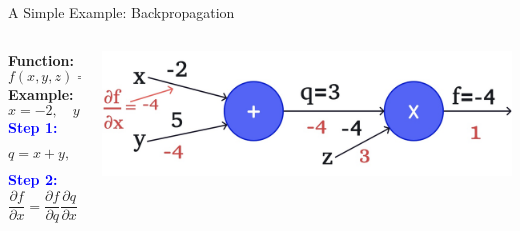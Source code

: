 \documentclass[serif, aspectratio=169]{beamer}
\begin{document}
\begin{frame}{A Simple Example: Backpropagation}

    \begin{columns}
       
        \begin{column}{0.3\textwidth}
            \vspace{-0.4cm}
            \textbf{Function:} 
            \[
            f(x, y, z) = (x + y)z
            \]
            \textbf{Example:} 
            \[
            x = -2, \quad y = 5, \quad z = -4
            \]
            \vspace{-0.4cm}
            \textcolor{blue}{\textbf{Step 1:}}
            \[
             q = x + y, \quad
            \frac{\partial q}{\partial x} = 1, \quad \frac{\partial q}{\partial y} = 1
            \]
            \vspace{-0.2cm}
            \textcolor{blue}{\textbf{Step 2:}}
            \[
            \frac{\partial f}{\partial x} =  \frac{\partial f}{\partial q}
            \frac{\partial q}{\partial x} = -4 \cdot 1 = -4
            \]
        \end{column}

        \begin{column}{0.7\textwidth}
                    \begin{center}
                \includegraphics[width=\textwidth, keepaspectratio]{pic/b7.jpg}
            \end{center}
        \end{column}

    \end{columns}

\end{frame}
\end{document}
